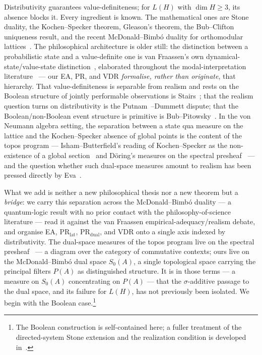 \smallskip
Distributivity guarantees value-definiteness; for $L(H)$ with
$\dim H \geq 3$, its absence blocks it.  Every ingredient is known.  The
mathematical ones are Stone duality, the Kochen--Specker theorem,
Gleason's theorem, the Bub--Clifton uniqueness result, and the recent
McDonald--Bimb\'{o} duality for orthomodular
lattices~\cite{McDonaldBimbo2023}.  The philosophical architecture is
older still: the distinction between a probabilistic state and a
value-definite one is van Fraassen's own dynamical-state/value-state
distinction~\cite{vanFraassen1991}, elaborated throughout the
modal-interpretation literature~\cite{Bub1997, DieksVermaas1995, Bueno2014}
--- our EA, PR, and VDR \emph{formalise, rather than originate}, that
hierarchy.  That value-definiteness is separable from realism and rests
on the Boolean structure of jointly performable observations is
Stairs~\cite{Stairs1983}; that the realism question turns on
distributivity is the Putnam~\cite{Putnam1968}--Dummett dispute; that
the Boolean/non-Boolean event structure is primitive is
Bub--Pitowsky~\cite{BubPitowsky2010}.  In the von Neumann algebra
setting, the separation between a state qua measure on the lattice and
the Kochen--Specker absence of global points is the content of the topos
program --- Isham--Butterfield's reading of Kochen--Specker as the
non-existence of a global section~\cite{IshamButterfield1998} and
D\"{o}ring's measures on the spectral presheaf~\cite{Doring2008} --- and
the question whether such dual-space measures amount to realism has been
pressed directly by Eva~\cite{Eva2017}.

What we add is neither a new philosophical thesis nor a new theorem but
a \emph{bridge}: we carry this separation across the McDonald--Bimb\'{o}
duality --- a quantum-logic result with no prior contact with the
philosophy-of-science literature --- read it against the van Fraassen
empirical-adequacy/realism debate, and organise EA,
$\text{PR}_{\text{lat}}$, $\text{PR}_{\text{dual}}$, and VDR onto a
single axis indexed by distributivity.  The dual-space measures of the
topos program live on the spectral presheaf~\cite{Doring2008,
CannonDoring2018} --- a diagram over the category of commutative
contexts; ours live on the McDonald--Bimb\'{o} dual space $S_0(A)$, a
single topological space carrying the principal filters $P(A)$ as
distinguished structure.  It is in those terms --- a measure on
$S_0(A)$ concentrating on $P(A)$ --- that the $\sigma$-additive passage
to the dual space, and its failure for $L(H)$, has not previously been
isolated.
We begin with the Boolean case.\footnote{The Boolean construction is
self-contained here; a fuller treatment of the directed-system Stone
extension and the realization condition is developed
in~\cite{mahon2026}.}

